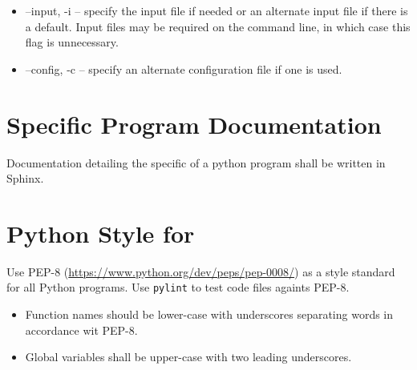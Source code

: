 \begin{itemize}
  \item --input, -i -- specify the input file if needed or an alternate
   input file if there is a default. Input files may be required on the
   command line, in which case this flag is unnecessary.

 \item --config, -c -- specify an alternate configuration file if one
   is used.
\end{itemize}


\section{Specific Program Documentation}

Documentation detailing the specific of a python program shall be
written in Sphinx.


\section{Python Style for \ProjectName}

Use PEP-8  (\url{https://www.python.org/dev/peps/pep-0008/}) as a
style standard for all Python programs. Use \texttt{pylint} to test
code files againts PEP-8.

\begin{itemize}
  \item Function names should be lower-case with underscores
    separating words in accordance wit PEP-8.
  \item Global variables shall be upper-case with two leading
    underscores.
\end{itemize}

